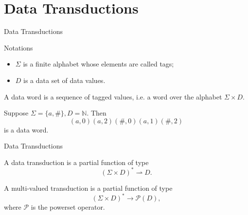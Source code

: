 \documentclass[landscape]{beamer}
\newcommand{\calO}{\mathcal{O}}
\newcommand{\setN}{\mathbb{N}}
\newcommand{\calP}{\mathcal{P}}
\begin{document}
\section{Data Transductions}
\newcommand{\sigxd}{\Sigma \times D}
\newcommand{\tagproj}{|_\Sigma}
\begin{frame}{Data Transductions}
    \begin{block}{Notations}
    \begin{itemize}
        \item $\Sigma$ is a finite alphabet whose elements are called \alert{tags};
        \item $D$ is a data set of \alert{data values}.
    \end{itemize}
    \end{block}
    
    \pause

    \begin{definition}
    A \alert{data word} is a sequence of tagged values,
    i.e. a word over the alphabet $\Sigma \times D$.
    \end{definition}
    \pause
    \begin{example}
        Suppose $\Sigma = \{ a, \# \}, D = \setN$. Then
        \[ (a,0)(a,2)(\#,0)(a,1)(\#,2) \]
        is a data word.
    \end{example}
\end{frame}
\begin{frame}{Data Transductions}
    \begin{definition}
    A \alert{data transduction} is a partial function of type
    \[ (\Sigma \times D)^* \rightharpoonup D. \]
    \end{definition}
    \pause
    
    \begin{definition}
    A multi-valued transduction is a partial function of type
    \[ (\sigxd)^* \to \mathcal{P}(D), \]
    where $\calP$ is the powerset operator.
    \end{definition}
    
\end{frame}
\end{document}
